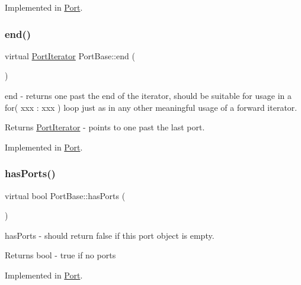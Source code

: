 Implemented in \hyperlink{class_port_abf4d86026b67f6c02db3e3abb0f2e8b4}{Port}.

\hypertarget{class_port_base_a50427e7a1beea0d5111ccc81ee418178}{}\label{class_port_base_a50427e7a1beea0d5111ccc81ee418178} 
\subsubsection{\texorpdfstring{end()}{end()}}
{\footnotesize\ttfamily virtual \hyperlink{class_port_iterator}{Port\+Iterator} Port\+Base\+::end (\begin{DoxyParamCaption}{ }\end{DoxyParamCaption})\hspace{0.3cm}{\ttfamily [pure virtual]}}

end -\/ returns one past the end of the iterator, should be suitable for usage in a for( xxx \+: xxx ) loop just as in any other meaningful usage of a forward iterator. \begin{DoxyReturn}{Returns}
\hyperlink{class_port_iterator}{Port\+Iterator} -\/ points to one past the last port. 
\end{DoxyReturn}


Implemented in \hyperlink{class_port_aa85be3fb7734863d482bf002e0f0923d}{Port}.

\hypertarget{class_port_base_a29870b5e201f46a806d2269d7f4635dc}{}\label{class_port_base_a29870b5e201f46a806d2269d7f4635dc} 
\subsubsection{\texorpdfstring{has\+Ports()}{hasPorts()}}
{\footnotesize\ttfamily virtual bool Port\+Base\+::has\+Ports (\begin{DoxyParamCaption}{ }\end{DoxyParamCaption})\hspace{0.3cm}{\ttfamily [pure virtual]}}

has\+Ports -\/ should return false if this port object is empty. \begin{DoxyReturn}{Returns}
bool -\/ true if no ports 
\end{DoxyReturn}


Implemented in \hyperlink{class_port_a7042f5b5c2ab14c9591a4984811a6012}{Port}.

\hypertarget{class_port_base_ad034502b053f3cd7939d651b2d72cd0a}{}\label{class_port_base_ad034502b053f3cd7939d651b2d72cd0a} 
